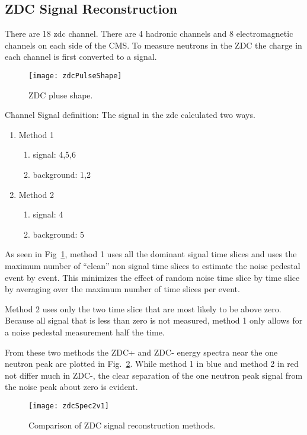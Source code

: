     \subsection{ZDC Signal Reconstruction}
      There are 18 zdc channel. 
      There are 4 hadronic channels and 8 electromagnetic channels on each side
        of the CMS. 
      To measure neutrons in the ZDC the charge in each channel is first 
        converted to a signal. 

	\begin{figure}[h]
		\centering
		\texttt{[image: zdcPulseShape]}
		\caption{ZDC pluse shape.}
		\label{fig:zdcPulseShape}
	\end{figure}

      Channel Signal definition:
      The signal in the zdc calculated two ways. 
      \begin{enumerate}
	\item Method 1
	\begin{enumerate}
	  \item signal: 4,5,6 
          \item background: 1,2
        \end{enumerate}
	\item Method 2
	\begin{enumerate}
	  \item signal: 4
	  \item background: 5
        \end{enumerate}
      \end{enumerate}

      As seen in Fig~\ref{fig:zdcPulseShape}, method 1 uses all the dominant 
        signal time slices and uses the maximum number of “clean” non signal 
        time slices to estimate the noise pedestal event by event. 
      This minimizes the effect of random noise time slice by time slice by 
        averaging over the maximum number of time slices per event. 

      Method 2 uses only the two time slice that are most likely to be above 
        zero. 
      Because all signal that is less than zero is not measured, method 1 
        only allows for a noise pedestal measurement half the time.
    
      From these two methods the ZDC+ and ZDC- energy spectra near the 
        one neutron peak are plotted in Fig.~\ref{fig:zdcSpec2v1}.
      While method 1 in blue and method 2 in red not differ much in ZDC-, 
        the clear separation of the one neutron peak signal from the noise 
        peak about zero is evident. 
      \begin{figure}[h]
        \centering
        \texttt{[image: zdcSpec2v1]}
        \caption{Comparison of ZDC signal reconstruction methods.}
        \label{fig:zdcSpec2v1}
      \end{figure}

